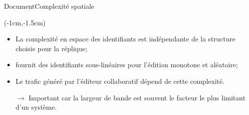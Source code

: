 \begin{frame}{Document}{Complexité spatiale}
  \vspace{1cm}
  
  \begin{textblock*}{\textwidth}(-1cm,-1.5cm) 
    \begin{table}[H]
      
    \end{table}
  \end{textblock*}
  
  \vspace{2cm}
  
  \begin{itemize}
  \item La complexité en espace des identifiants est indépendante de la
    structure choisie pour la réplique;
  \item \LSEQ fournit des identifiants sous-linéaires pour l'édition monotone
    et aléatoire;
  \item Le trafic généré par l'éditeur collaboratif dépend de cette complexité.
  \item [$\rightarrow$] Important car la largeur de bande est souvent le facteur
    le plus limitant d'un système.
  \end{itemize}
  
  
\end{frame}


